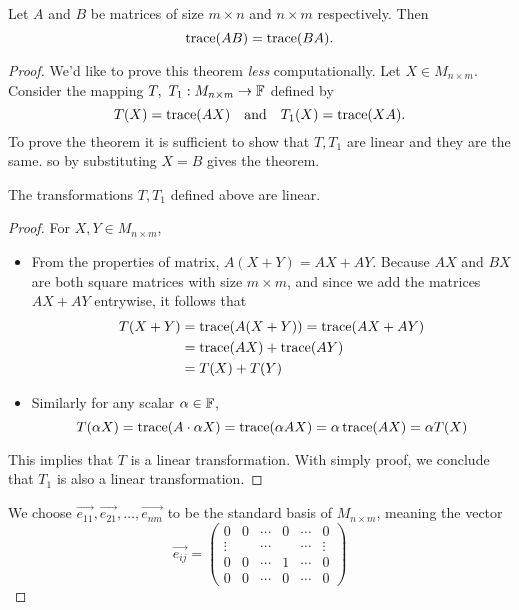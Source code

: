 \documentclass{article}
\def\by{\times}
\begin{document}
\begin{homework}\label{_trace}
  Let $A$ and $B$ be matrices of size $m\by n$ and $n\by m$ 
  respectively. Then \[\operatorname{trace}(AB)=\operatorname{trace}(BA).\]
\end{homework}
\begin{proof}
  We'd like to prove this theorem \emph{less} computationally.
  Let $X\in M_{n\by m}$. Consider the mapping
  $T,~T_1: M_{n\by m}\to\F$ defined by
  \[
    T(X)=\operatorname{trace}(AX)
    \quad\text{and}\quad
    T_1(X)=\operatorname{trace}(XA).
  \]
  To prove the theorem it is sufficient to show that 
  $T,T_1$ are linear and they are the same.
  so by substituting $X=B$ gives the theorem.
  \begin{claim}
    The transformations $T,T_1$ defined above are linear.
  \end{claim}
  \begin{proof}
    For $X,Y\in M_{n\by m}$,
    \begin{itemize}
      \item From the properties of matrix, $A(X+Y)=AX+AY$. 
        Because $AX$ and $BX$ are both square matrices with 
        size $m\by m$, and since we add the matrices $AX+AY$
        entrywise, it follows that
        \begin{align*}
          T(X+Y)&=\operatorname{trace}(A(X+Y))=\operatorname{trace}(AX+AY)\\
                &=\operatorname{trace}(AX)+\operatorname{trace}(AY)\\
                &=T(X)+T(Y)
        \end{align*}
      \item Similarly for any scalar $\alpha\in\F$,
        \[
          T(\alpha X)=\operatorname{trace}(A\cdot\alpha X)
          =\operatorname{trace}(\alpha AX)=\alpha\operatorname{trace}(AX)=\alpha T(X)
        \]
    \end{itemize}
    This implies that $T$ is a linear transformation. With simply
    proof, we conclude that $T_1$ is also a linear transformation.
  \end{proof}
  We choose $\vec{e_{11}},\vec{e_{21}},\dots,\vec{e_{nm}}$ to be 
  the standard basis of $M_{n\by m}$, meaning the vector
  \[
    \vec{e_{ij}}=
    \begin{pmatrix}
      0 & 0 & \cdots & 0 & \cdots & 0\\
      \vdots  & & \cdots & & \cdots & \vdots\\
      0 & 0 & \cdots & 1 & \cdots & 0\\
      0 & 0 & \cdots & 0 & \cdots & 0
    \end{pmatrix}
\]
\end{proof}
\end{document}
